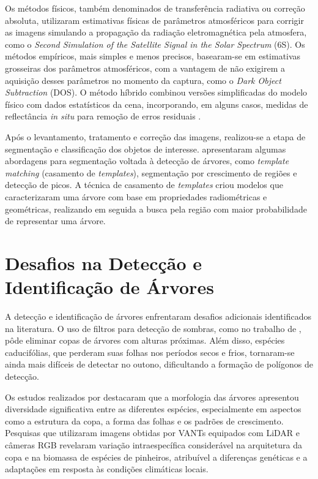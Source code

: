 \documentclass[
    12pt,
    openright,
    oneside,
    a4paper,
    sumario=tradicional,
    english,
    brazil,
    ]{abntex2}
\begin{document}
Os métodos físicos, também denominados de transferência radiativa ou correção absoluta, utilizaram estimativas físicas de parâmetros atmosféricos para corrigir as imagens simulando a propagação da radiação eletromagnética pela atmosfera, como o \textit{Second Simulation of the Satellite Signal in the Solar Spectrum} (6S). Os métodos empíricos, mais simples e menos precisos, basearam-se em estimativas grosseiras dos parâmetros atmosféricos, com a vantagem de não exigirem a aquisição desses parâmetros no momento da captura, como o \textit{Dark Object Subtraction} (DOS). O método híbrido combinou versões simplificadas do modelo físico com dados estatísticos da cena, incorporando, em alguns casos, medidas de reflectância \textit{in situ} para remoção de erros residuais \cite{langhi2008correccao}.

Após o levantamento, tratamento e correção das imagens, realizou-se a etapa de segmentação e classificação dos objetos de interesse. \textcite{erigo} apresentaram algumas abordagens para segmentação voltada à detecção de árvores, como \textit{template matching} (casamento de \textit{templates}), segmentação por crescimento de regiões e detecção de picos. A técnica de casamento de \textit{templates} criou modelos que caracterizaram uma árvore com base em propriedades radiométricas e geométricas, realizando em seguida a busca pela região com maior probabilidade de representar uma árvore.

\section{Desafios na Detecção e Identificação de Árvores}

A detecção e identificação de árvores enfrentaram desafios adicionais identificados na literatura. O uso de filtros para detecção de sombras, como no trabalho de \textcite{dos2006detecccao}, pôde eliminar copas de árvores com alturas próximas. Além disso, espécies caducifólias, que perderam suas folhas nos períodos secos e frios, tornaram-se ainda mais difíceis de detectar no outono, dificultando a formação de polígonos de detecção.

Os estudos realizados por \textcite{rs14225904} destacaram que a morfologia das árvores apresentou diversidade significativa entre as diferentes espécies, especialmente em aspectos como a estrutura da copa, a forma das folhas e os padrões de crescimento. Pesquisas que utilizaram imagens obtidas por VANTs equipados com LiDAR e câmeras RGB revelaram variação intraespecífica considerável na arquitetura da copa e na biomassa de espécies de pinheiros, atribuível a diferenças genéticas e a adaptações em resposta às condições climáticas locais.
\end{document}

